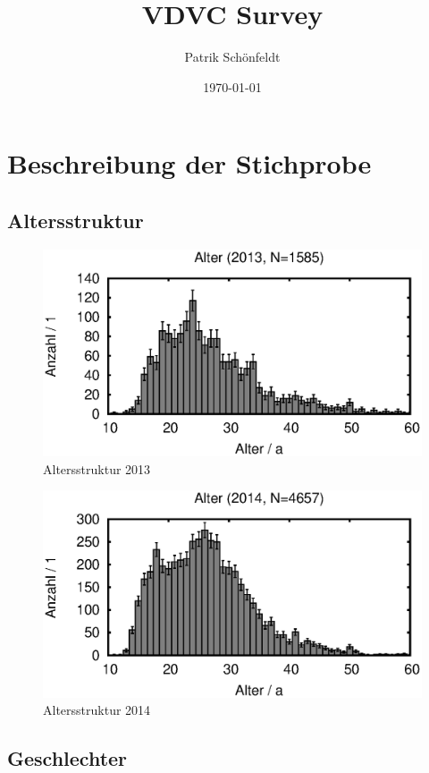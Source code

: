 \documentclass[11pt]{scrartcl}
\title{VDVC Survey}
\author{Patrik Schönfeldt}
\date{\today}
\begin{document}
\maketitle

\section{Beschreibung der Stichprobe}
\subsection{Altersstruktur}

\begin{figure}[htbp]
   \centering
   \includegraphics{2013/alter}
   \caption{Altersstruktur 2013}
   \label{fig:2013-alter}
\end{figure}

\begin{figure}[htbp]
   \centering
   \includegraphics{2014/alter}
   \caption{Altersstruktur 2014}
   \label{fig:2014-alter}
\end{figure}


\subsection{Geschlechter}
\end{document}
